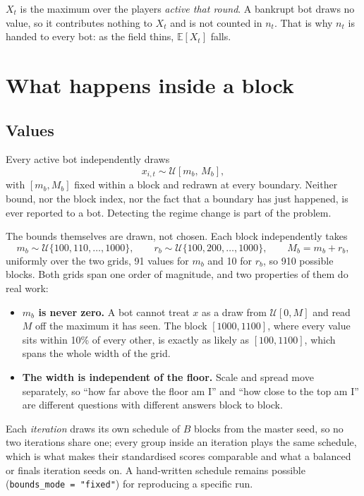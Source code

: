 \documentclass[11pt,a4paper]{article}
\newcommand{\code}[1]{\texttt{\small #1}}
\begin{document}
\noindent
$X_t$ is the maximum over the players \emph{active that round}. A bankrupt bot
draws no value, so it contributes nothing to $X_t$ and is not counted in $n_t$.
That is why $n_t$ is handed to every bot: as the field thins, $\mathbb{E}[X_t]$
falls.

\section{What happens inside a block}

\subsection{Values}
Every active bot independently draws
\begin{equation}
  x_{i,t} \sim \mathcal{U}[m_b,\, M_b],
\end{equation}
with $[m_b, M_b]$ fixed within a block and redrawn at every boundary. Neither
bound, nor the block index, nor the fact that a boundary has just happened, is
ever reported to a bot. Detecting the regime change is part of the problem.

The bounds themselves are drawn, not chosen. Each block independently takes
\begin{equation}
  m_b \sim \mathcal{U}\{100, 110, \dots, 1000\},
  \qquad
  r_b \sim \mathcal{U}\{100, 200, \dots, 1000\},
  \qquad
  M_b = m_b + r_b,
  \label{eq:bounds}
\end{equation}
uniformly over the two grids, 91 values for $m_b$ and 10 for $r_b$, so 910
possible blocks. Both grids span one order of magnitude, and two properties of
them do real work:

\begin{itemize}[nosep,leftmargin=1.4em]
\item \textbf{$m_b$ is never zero.} A bot cannot treat $x$ as a draw from
  $\mathcal{U}[0, M]$ and read $M$ off the maximum it has seen. The block
  $[1000, 1100]$, where every value sits within 10\% of every other, is exactly
  as likely as $[100, 1100]$, which spans the whole width of the grid.
\item \textbf{The width is independent of the floor.} Scale and spread move
  separately, so ``how far above the floor am I'' and ``how close to the top am
  I'' are different questions with different answers block to block.
\end{itemize}

\noindent
Each \emph{iteration} draws its own schedule of $B$ blocks from the master seed,
so no two iterations share one; every group inside an iteration plays the same
schedule, which is what makes their standardised scores comparable and what a
balanced or finals iteration seeds on. A hand-written schedule remains possible
(\code{bounds\_mode = "fixed"}) for reproducing a specific run.
\end{document}
